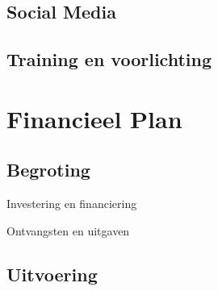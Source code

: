 \documentclass[]{book}
\begin{document}
\section{Social Media}\label{social-media}

\section{Training en voorlichting}\label{training-en-voorlichting}

\chapter{Financieel Plan}\label{financieel-plan}

\section{Begroting}\label{begroting}

Investering en financiering

Ontvangsten en uitgaven

\section{Uitvoering}\label{uitvoering}


\end{document}
